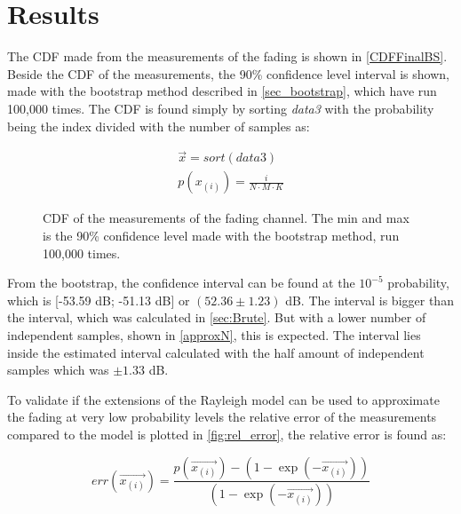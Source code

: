 \section{Results}

The CDF made from the measurements of the fading is shown in \autoref{CDFFinalBS}. Beside the CDF of the measurements, the 90\% confidence level interval is shown, made with the bootstrap method described in \autoref{sec_bootstrap}, which have run 100,000 times. The CDF is found simply by sorting \textit{data3} with the probability being the index divided with the number of samples as:

\begin{align}
\overrightarrow{x} = sort(data3)\\
p(x_{(i)}) = \frac{i}{N\cdot M\cdot K} 
\end{align} 
\begin{where}
\end{where}

\begin{figure}[H]
\centering

\caption{CDF of the measurements of the fading channel. The min and max is the 90\% confidence level made with the bootstrap method, run 100,000 times.}
\label{CDFFinalBS}
\end{figure}

From the bootstrap, the confidence interval can be found at the $10^{-5}$ probability, which is [-53.59 dB; -51.13 dB] or $(52.36\pm 1.23)$ dB. The interval is bigger than the interval, which was calculated in \autoref{sec:Brute}. But with a lower number of independent samples, shown in \autoref{approxN}, this is expected. The interval lies inside the estimated interval calculated with the half amount of independent samples which was $\pm 1.33$ dB.


To validate if the extensions of the Rayleigh model can be used to approximate the fading at very low probability levels the relative error of the measurements compared to the model is plotted in \autoref{fig:rel_error}, the relative error is found as:

\begin{equation}
err(\overrightarrow{x_{(i)}}) = \frac{p(\overrightarrow{x_{(i)}})-\left(1-\exp(-\overrightarrow{x_{(i)}})\right)}{(1-\exp(-\overrightarrow{x_{(i)}}))}
\end{equation}
\begin{where}
\end{where}


